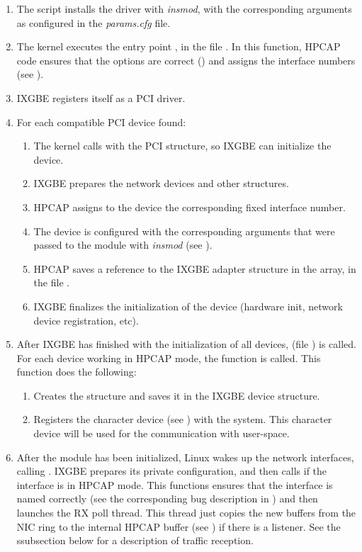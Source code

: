 \documentclass[oneside]{hpman}
\begin{document}
\begin{enumerate}
\item The  script installs the driver with \textit{insmod}, with the corresponding arguments as configured in the \textit{params.cfg} file.
\item The kernel executes the entry point , in the file . In this function, HPCAP code ensures that the options are correct () and assigns the interface numbers (see ).
\item IXGBE registers itself as a PCI driver.
\item For each compatible PCI device found:
\begin{enumerate}
\item The kernel calls  with the PCI structure, so IXGBE can initialize the device.
\item IXGBE prepares the network devices and other structures.
\item HPCAP assigns to the device the corresponding fixed interface number.
\item The device is configured with the corresponding arguments that were passed to the module with \textit{insmod} (see ).
\item HPCAP saves a reference to the IXGBE adapter structure in the  array, in the file .
\item IXGBE finalizes the initialization of the device (hardware init, network device registration, etc).
\end{enumerate}
\item After IXGBE has finished with the initialization of all devices,  (file ) is called. For each device working in HPCAP mode, the function  is called. This function does the following:
\begin{enumerate}
\item Creates the  structure and saves it in the IXGBE device structure.
\item Registers the character device (see ) with the system. This character device will be used for the communication with user-space.
\end{enumerate}
\item After the module has been initialized, Linux wakes up the network interfaces, calling . IXGBE prepares its private configuration, and then calls  if the interface is in HPCAP mode. This functions ensures that the interface is named correctly (see the corresponding bug description in ) and then launches the RX poll thread. This thread just copies the new buffers from the NIC ring to the internal HPCAP buffer (see ) if there is a listener. See the ssubsection below for a description of traffic reception.

\end{enumerate}
\end{document}
